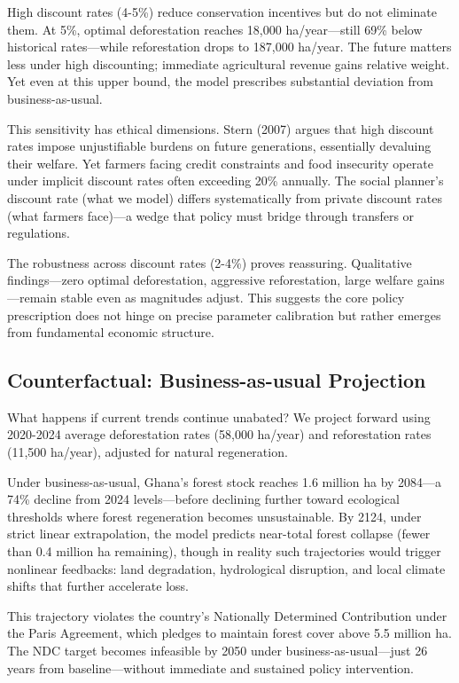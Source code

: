 High discount rates (4-5\%) reduce conservation incentives but do not eliminate them. At 5\%, optimal deforestation reaches 18,000 ha/year—still 69\% below historical rates—while reforestation drops to 187,000 ha/year. The future matters less under high discounting; immediate agricultural revenue gains relative weight. Yet even at this upper bound, the model prescribes substantial deviation from business-as-usual.

This sensitivity has ethical dimensions. Stern (2007) argues that high discount rates impose unjustifiable burdens on future generations, essentially devaluing their welfare. Yet farmers facing credit constraints and food insecurity operate under implicit discount rates often exceeding 20\% annually. The social planner's discount rate (what we model) differs systematically from private discount rates (what farmers face)—a wedge that policy must bridge through transfers or regulations.

The robustness across discount rates (2-4\%) proves reassuring. Qualitative findings—zero optimal deforestation, aggressive reforestation, large welfare gains—remain stable even as magnitudes adjust. This suggests the core policy prescription does not hinge on precise parameter calibration but rather emerges from fundamental economic structure.

\subsection{Counterfactual: Business-as-usual Projection}

What happens if current trends continue unabated? We project forward using 2020-2024 average deforestation rates (58,000 ha/year) and reforestation rates (11,500 ha/year), adjusted for natural regeneration.

Under business-as-usual, Ghana's forest stock reaches 1.6 million ha by 2084—a 74\% decline from 2024 levels—before declining further toward ecological thresholds where forest regeneration becomes unsustainable. By 2124, under strict linear extrapolation, the model predicts near-total forest collapse (fewer than 0.4 million ha remaining), though in reality such trajectories would trigger nonlinear feedbacks: land degradation, hydrological disruption, and local climate shifts that further accelerate loss.

This trajectory violates the country's Nationally Determined Contribution under the Paris Agreement, which pledges to maintain forest cover above 5.5 million ha. The NDC target becomes infeasible by 2050 under business-as-usual—just 26 years from baseline—without immediate and sustained policy intervention.

